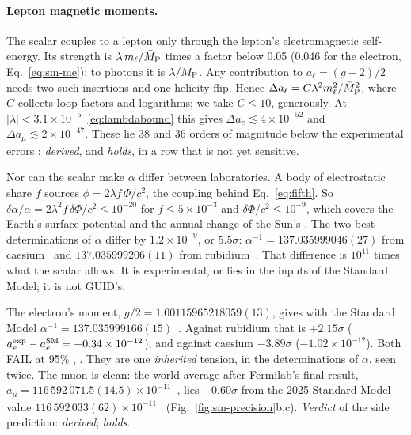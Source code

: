 \paragraph{Lepton magnetic moments.} The scalar couples to a lepton only through the lepton's electromagnetic self-energy. Its strength is
$\lambda\,m_\ell/\bar M_{\rm P}$ times a factor below 0.05 (0.046 for the electron, Eq.~\eqref{eq:sm-me}); to photons it is $\lambda/\bar M_{\rm P}$. Any
contribution to $a_\ell=(g-2)/2$ needs two such insertions and one helicity flip. Hence $\Delta a_\ell=C\lambda^2m_\ell^2/\bar M_{\rm P}^2$, where $C$
collects loop factors and logarithms; we take $C\le10$, generously. At $|\lambda|<3.1\times10^{-5}$~\eqref{eq:lambdabound} this gives
$\Delta a_e\lesssim4\times10^{-52}$ and $\Delta a_\mu\lesssim2\times10^{-47}$. These lie 38 and 36 orders of magnitude below the experimental errors
: \emph{derived}, and \emph{holds}, in a row that is not yet sensitive.

Nor can the scalar make $\alpha$ differ between laboratories. A body of electrostatic share $f$ sources $\phi=2\lambda f\,\Phi/c^2$, the coupling
behind Eq.~\eqref{eq:fifth}. So $\delta\alpha/\alpha=2\lambda^2f\,\delta\Phi/c^2\le10^{-20}$ for $f\le5\times10^{-3}$ and $\delta\Phi/c^2\le10^{-9}$, which
covers the Earth's surface potential and the annual change of the Sun's . The two best determinations of $\alpha$ differ by
$1.2\times10^{-9}$, or $5.5\sigma$: $\alpha^{-1}=137.035999046(27)$ from caesium~\cite{parker2018} and $137.035999206(11)$ from
rubidium~\cite{morel2020}. That difference is $10^{11}$ times what the scalar allows. It is experimental, or lies in the inputs of the
Standard Model; it is not GUID's.

The electron's moment, $g/2=1.00115965218059(13)$, gives with the Standard Model $\alpha^{-1}=137.035999166(15)$~\cite{fan}. Against rubidium that
is $+2.15\sigma$ ($a_e^{\rm exp}-a_e^{\rm SM}=+0.34\times10^{-12}$), and against caesium $-3.89\sigma$ ($-1.02\times10^{-12}$). Both FAIL at 95\%
, . They are one \emph{inherited} tension, in the determinations of $\alpha$, seen twice. The muon is clean: the
world average after Fermilab's final result, $a_\mu=116\,592\,071.5(14.5)\times10^{-11}$~\cite{muongtwo2025}, lies $+0.60\sigma$ from the 2025
Standard Model value $116\,592\,033(62)\times10^{-11}$~\cite{aliberti2025}  (Fig.~\ref{fig:sm-precision}b,c). \emph{Verdict} of the
side prediction: \emph{derived}; \emph{holds}.

